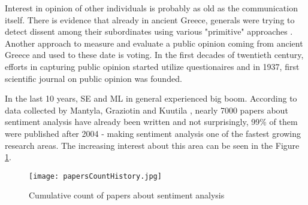 Interest in opinion of other individuals is probably as old as the communication itself. There is evidence that already in ancient Greece, generals were trying to detect dissent among their subordinates using various "primitive" approaches \cite{richmond1998spies}. Another approach to measure and evaluate a public opinion coming from ancient Greece and used to these date is voting. In the first decades of twentieth century, efforts in capturing public opinion started utilize questionaires and in 1937, first scientific journal on public opinion was founded. 

In the last 10 years, SE and ML in general experienced big boom. According to data collected by Mantyla, Graziotin and Kuutila \cite{mantyla2018evolution}, nearly 7000 papers about sentiment analysis have already been written and not surprisingly, 99\% of them were published after 2004 - making sentiment analysis one of the fastest growing research areas. The increasing interest about this area can be seen in the Figure \ref{fig:papersCountHistory}.

\begin{figure}[H]%
    \centering
	\texttt{[image: papersCountHistory.jpg]}
    \caption{Cumulative count of papers about sentiment analysis \cite{mantyla2018evolution}}%
    \label{fig:papersCountHistory}%
\end{figure}

